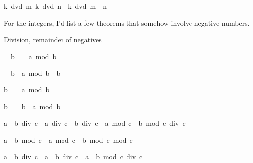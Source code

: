 \begin{isabellebody}
\begin{isamarkuptext}
\begin{isabelle}%
{\isasymlbrakk}k\ dvd\ m{\isacharsemicolon}\ k\ dvd\ n{\isasymrbrakk}\ {\isasymLongrightarrow}\ k\ dvd\ m\ {\isacharplus}\ n%
\end{isabelle}

For the integers, I'd list a few theorems that somehow involve negative 
numbers.  

Division, remainder of negatives


\begin{isabelle}%
{\isacharhash}{}\ {\isacharless}\ b\ {\isasymLongrightarrow}\ {\isacharhash}{}\ {\isasymle}\ a\ mod\ b%
\end{isabelle}

\begin{isabelle}%
{\isacharhash}{}\ {\isacharless}\ b\ {\isasymLongrightarrow}\ a\ mod\ b\ {\isacharless}\ b%
\end{isabelle}

\begin{isabelle}%
b\ {\isacharless}\ {\isacharhash}{}\ {\isasymLongrightarrow}\ a\ mod\ b\ {\isasymle}\ {\isacharhash}{}%
\end{isabelle}

\begin{isabelle}%
b\ {\isacharless}\ {\isacharhash}{}\ {\isasymLongrightarrow}\ b\ {\isacharless}\ a\ mod\ b%
\end{isabelle}

\begin{isabelle}%
{\isacharparenleft}a\ {\isacharplus}\ b{\isacharparenright}\ div\ c\ {\isacharequal}\ a\ div\ c\ {\isacharplus}\ b\ div\ c\ {\isacharplus}\ {\isacharparenleft}a\ mod\ c\ {\isacharplus}\ b\ mod\ c{\isacharparenright}\ div\ c%
\end{isabelle}

\begin{isabelle}%
{\isacharparenleft}a\ {\isacharplus}\ b{\isacharparenright}\ mod\ c\ {\isacharequal}\ {\isacharparenleft}a\ mod\ c\ {\isacharplus}\ b\ mod\ c{\isacharparenright}\ mod\ c%
\end{isabelle}

\begin{isabelle}%
a\ {\isacharasterisk}\ b\ div\ c\ {\isacharequal}\ a\ {\isacharasterisk}\ {\isacharparenleft}b\ div\ c{\isacharparenright}\ {\isacharplus}\ a\ {\isacharasterisk}\ {\isacharparenleft}b\ mod\ c{\isacharparenright}\ div\ c%
\end{isabelle}


\end{isamarkuptext}
\end{isabellebody}
